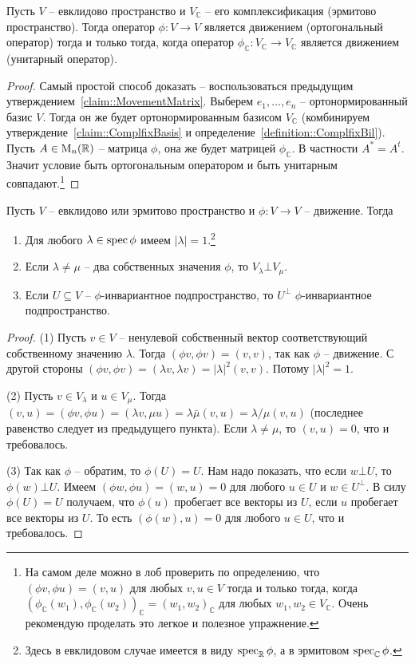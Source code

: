 \begin{claim}\label{claim::MovementComplfix}
Пусть $V$ -- евклидово пространство и $V_\mathbb C$ -- его комплексификация (эрмитово пространство). Тогда оператор $\phi \colon V\to V$ является движением (ортогональный оператор) тогда и только тогда, когда оператор $\phi_\mathbb C\colon V_\mathbb C\to V_\mathbb C$ является движением (унитарный оператор).
\end{claim}
\begin{proof}
Самый простой способ доказать -- воспользоваться предыдущим утверждением~\ref{claim::MovementMatrix}. Выберем $e_1,\ldots,e_n$ -- ортонормированный базис $V$. Тогда он же будет ортонормированным базисом $V_\mathbb C$ (комбинируем утверждение~\ref{claim::ComplfixBasis} и определение~\ref{definition::ComplfixBil}). Пусть $A\in\operatorname{M}_{n}(\mathbb R)$ -- матрица $\phi$, она же будет матрицей $\phi_\mathbb C$. В частности $A^* = A^t$. Значит условие быть ортогональным оператором и быть унитарным совпадают.\footnote{На самом деле можно в лоб проверить по определению, что $(\phi v, \phi u) = (v, u)$ для любых $v,u\in V$ тогда и только тогда, когда $(\phi_\mathbb C(w_1), \phi_\mathbb C(w_2))_\mathbb C = (w_1,w_2)_\mathbb C$ для любых $w_1,w_2\in V_\mathbb C$. Очень рекомендую проделать это легкое и полезное упражнение.}
\end{proof}


\begin{claim}\label{claim::MovmentBasisProp}
Пусть $V$ -- евклидово или эрмитово пространство и $\phi\colon V\to V$ -- движение. Тогда
\begin{enumerate}
\item Для любого $\lambda\in \operatorname{spec} \phi$ имеем $|\lambda| = 1$.\footnote{Здесь в евклидовом случае имеется в виду $\operatorname{spec}_\mathbb R \phi$, а в эрмитовом $\operatorname{spec}_\mathbb C\phi$.}
\item Если $\lambda\neq \mu$ -- два собственных значения $\phi$, то $V_\lambda \bot V_\mu$.
\item Если $U\subseteq V$ -- $\phi$-инвариантное подпространство, то $U^\bot$ $\phi$-инвариантное подпространство.
\end{enumerate}
\end{claim}
\begin{proof}
(1) Пусть $v\in V$ -- ненулевой собственный вектор соответствующий собственному значению $\lambda$. Тогда $(\phi v, \phi v) = (v, v)$, так как $\phi$ -- движение. С другой стороны $(\phi v, \phi v) = (\lambda v, \lambda v) = |\lambda|^2(v, v)$. Потому $|\lambda|^2 = 1$.

(2) Пусть $v\in V_\lambda$ и $u\in V_\mu$. Тогда $(v,u) = (\phi v, \phi u) = (\lambda v,\mu u) = \lambda \bar \mu (v, u) = \lambda/\mu(v,u)$ (последнее равенство следует из предыдущего пункта). Если $\lambda \neq \mu$, то $(v,u) = 0$, что и требовалось.

(3) Так как $\phi$ -- обратим, то $\phi(U) = U$. Нам надо показать, что если $w\bot U$, то $\phi(w)\bot U$. Имеем $(\phi w, \phi u) = (w, u) =0$ для любого $u\in U$ и $w\in U^\bot$. В силу $\phi(U) = U$ получаем, что $\phi(u)$ пробегает все векторы из $U$, если $u$ пробегает все векторы из $U$. То есть $(\phi(w), u) = 0$ для любого $u\in U$, что и требовалось.
\end{proof}